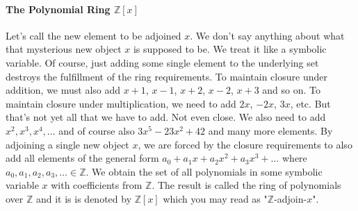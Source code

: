 \paragraph{The Polynomial Ring $\mathbb{Z}[x]$}
Let's call the new element to be adjoined $x$. We don't say anything about what that mysterious new object $x$ is supposed to be. We treat it like a symbolic variable. Of course, just adding some single element to the underlying set destroys the fulfillment of the ring requirements. To maintain closure under addition, we must also add $x+1$, $x-1$, $x+2$, $x-2$, $x+3$ and so on. To maintain closure under multiplication, we need to add $2 x$, $-2 x$, $3 x$, etc. But that's not yet all that we have to add. Not even close. We also need to add $x^2, x^3, x^4, \ldots$ and of course also $3 x^5 - 23 x^2 + 42$ and many more elements. By adjoining a single new object $x$, we are forced by the closure requirements to also add all elements of the general form $a_0 + a_1 x + a_2 x^2 + a_3 x^3 + \ldots$ where $a_0, a_1, a_2, a_3, \ldots \in \mathbb{Z}$. We obtain the set of all polynomials in some symbolic variable $x$ with coefficients from $\mathbb{Z}$. The result is called the ring of polynomials over $\mathbb{Z}$ and it is is denoted by $\mathbb{Z}[x]$ which you may read as "$\mathbb{Z}$-adjoin-$x$". 







